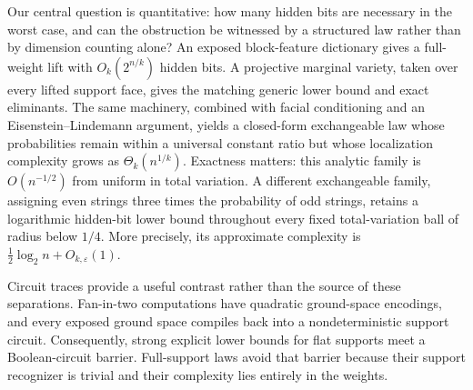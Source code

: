 \documentclass{article}
\begin{document}
Our central question is quantitative: how many hidden bits are necessary in
the worst case, and can the obstruction be witnessed by a structured law
rather than by dimension counting alone?  An exposed block-feature dictionary
gives a full-weight lift with $O_k(2^{n/k})$ hidden bits.  A projective marginal
variety, taken over every lifted support face, gives the matching generic lower
bound and exact eliminants.  The same machinery, combined with facial
conditioning and an Eisenstein--Lindemann argument, yields a closed-form
exchangeable law whose probabilities remain within a universal constant ratio
but whose localization complexity grows as $\Theta_k(n^{1/k})$.
Exactness matters: this analytic family is $O(n^{-1/2})$ from uniform in
total variation.  A different exchangeable family, assigning even strings
three times the probability of odd strings, retains a logarithmic hidden-bit
lower bound throughout every fixed total-variation ball of radius below
$1/4$.  More precisely, its approximate complexity is
$\frac12\log_2 n+O_{k,\varepsilon}(1)$.

Circuit traces provide a useful contrast rather than the source of these
separations.  Fan-in-two computations have quadratic ground-space encodings,
and every exposed ground space compiles back into a nondeterministic support
circuit.  Consequently, strong explicit lower bounds for flat supports meet a
Boolean-circuit barrier.  Full-support laws avoid that barrier because their
support recognizer is trivial and their complexity lies entirely in the
weights.
\end{document}
